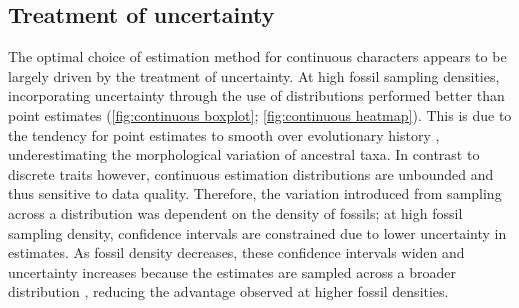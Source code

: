 \documentclass[11pt, a4paper]{article}
\begin{document}
\subsection{Treatment of uncertainty}
The optimal choice of estimation method for continuous characters appears to be largely driven by the treatment of uncertainty.
At high fossil sampling densities, incorporating uncertainty through the use of distributions performed better than point estimates (\autoref{fig:continuous boxplot}; \autoref{fig:continuous heatmap}).
This is due to the tendency for point estimates to smooth over evolutionary history \citep{boyko2024dentist,boyko2026resolving}, underestimating the morphological variation of ancestral taxa.
In contrast to discrete traits however, continuous estimation distributions are unbounded and thus sensitive to data quality.
Therefore, the variation introduced from sampling across a distribution was dependent on the density of fossils; at high fossil sampling density, confidence intervals are constrained due to lower uncertainty in estimates. %
As fossil density decreases, these confidence intervals widen and uncertainty increases because the estimates are sampled across a broader distribution \citep{schluter1997likelihood, martins1999estimation}, reducing the advantage observed at higher fossil densities.
\end{document}
